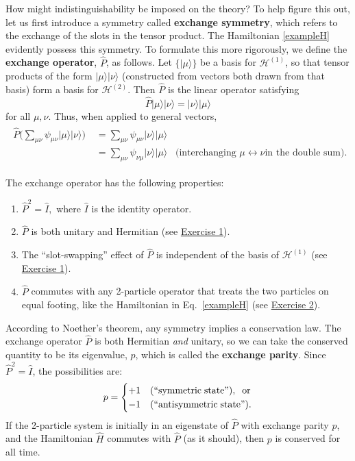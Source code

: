 \documentclass[prx,12pt]{revtex4-2}
\begin{document}
How might indistinguishability be imposed on the theory?  To help
figure this out, let us first introduce a symmetry called
\textbf{exchange symmetry}, which refers to the exchange of the slots
in the tensor product.  The Hamiltonian \eqref{exampleH} evidently
possess this symmetry.  To formulate this more rigorously, we define
the \textbf{exchange operator}, $\hat{P}$, as follows.  Let
$\{|\mu\rangle\}$ be a basis for $\mathscr{H}^{(1)}$, so that tensor
products of the form $|\mu\rangle |\nu\rangle$ (constructed from
vectors both drawn from that basis) form a basis for
$\mathscr{H}^{(2)}$.  Then $\hat{P}$ is the linear operator satisfying
\begin{equation}
  \hat{P} |\mu\rangle |\nu\rangle = |\nu\rangle|\mu\rangle
\end{equation}
for all $\mu, \nu$.  Thus, when applied to general vectors,
\begin{align}
  \begin{aligned}\hat{P} \Big (\sum_{\mu\nu}
    \psi_{\mu\nu} |\mu\rangle|\nu\rangle \Big)
    \;&=  \sum_{\mu\nu} \psi_{\mu\nu} |\nu\rangle|\mu\rangle \\
    &= \sum_{\mu\nu} \psi_{\nu\mu} |\nu\rangle|\mu\rangle
    \;\;\;\textrm{(interchanging $\mu\leftrightarrow \nu$
      in the double sum).}\end{aligned}
\end{align}

\noindent
The exchange operator has the following properties:
\begin{enumerate}
\item $\hat{P}^2 = \hat{I},$ where $\hat{I}$ is the identity operator.

\item $\hat{P}$ is both unitary and Hermitian (see
  \hyperref[ex:1]{Exercise 1}).
  
\item The ``slot-swapping'' effect of $\hat{P}$ is independent of the
  basis of $\mathscr{H}^{(1)}$ (see \hyperref[ex:1]{Exercise 1}).

\item $\hat{P}$ commutes with any 2-particle operator that treats the
  two particles on equal footing, like the Hamiltonian in
  Eq.~\eqref{exampleH} (see \hyperref[ex:2]{Exercise 2}).
\end{enumerate}

According to Noether's theorem, any symmetry implies a conservation
law.  The exchange operator $\hat{P}$ is both Hermitian \textit{and}
unitary, so we can take the conserved quantity to be its eigenvalue,
$p$, which is called the \textbf{exchange parity}.  Since $\hat{P}^2 =
\hat{I}$, the possibilities are:
\begin{equation}
  p = \begin{cases}+1 & \textrm{(``symmetric\;state'')}, \;\;\textrm{or} \\ -1 & \textrm{(``antisymmetric\;state'').}\end{cases}
\end{equation}
If the 2-particle system is initially in an eigenstate of $\hat{P}$
with exchange parity $p$, and the Hamiltonian $\hat{H}$ commutes with
$\hat{P}$ (as it should), then $p$ is conserved for all time.
\end{document}
